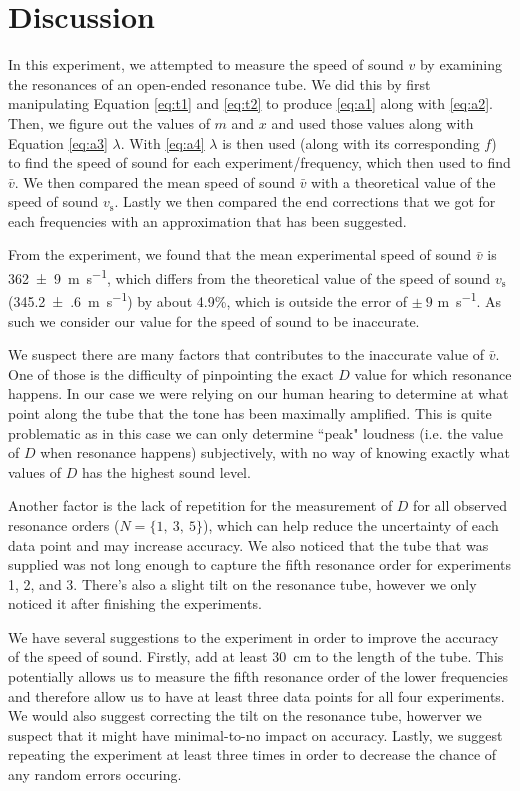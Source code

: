 \documentclass[letter]{article}
\numberwithin{equation}{section}
\numberwithin{figure}{section}
\numberwithin{table}{section}
\begin{document}
\section{Discussion}
In this experiment, we attempted to measure the speed of sound \(v\) by examining the resonances of an open-ended resonance tube. We did this by first manipulating Equation \ref{eq:t1} and \ref{eq:t2} to produce \eqref{eq:a1} along with \eqref{eq:a2}. Then, we figure out the values of \(m\) and \(x\) and used those values along with Equation \ref{eq:a3} \(\lambda\). With \eqref{eq:a4} \(\lambda\) is then used (along with its corresponding \(f\)) to find the speed of sound for each experiment/frequency, which then used to find \(\bar{v}\). We then compared the mean speed of sound \(\bar{v}\) with a theoretical value of the speed of sound \(v_\mathrm{s}\). Lastly we then compared the end corrections that we got for each frequencies with an approximation that has been suggested.

From the experiment, we found that the mean experimental speed of sound \(\bar{v}\) is \SI{362(9)}{\metre\per\second}, which differs from the theoretical value of the speed of sound \(v_{\mathrm{s}}\) (\SI{345.2(6)}{\metre\per\second}) by about 4.9\%, which is outside the error of \(\pm\ 9\) \si{\metre\per\second}. As such we consider our value for the speed of sound to be inaccurate.

We suspect there are many factors that contributes to the inaccurate value of \(\bar{v}\). One of those is the difficulty of pinpointing the exact \(D\) value for which resonance happens. In our case we were relying on our human hearing to determine at what point along the tube that the tone has been maximally amplified. This is quite problematic as in this case we can only determine ``peak" loudness (i.e. the value of \(D\) when resonance happens) subjectively, with no way of knowing exactly what values of \(D\) has the highest sound level.

Another factor is the lack of repetition for the measurement of \(D\) for all observed resonance orders (\(N = \{1, \ 3, \ 5\}\)), which can help reduce the uncertainty of each data point and may increase accuracy. We also noticed that the tube that was supplied was not long enough to capture the fifth resonance order for experiments 1, 2, and 3. There's also a slight tilt on the resonance tube, however we only noticed it after finishing the experiments.

We have several suggestions to the experiment in order to improve the accuracy of the speed of sound. Firstly, add at least \SI{30}{\cm} to the length of the tube. This potentially allows us to measure the fifth resonance order of the lower frequencies and therefore allow us to have at least three data points for all four experiments. We would also suggest correcting the tilt on the resonance tube, howerver we suspect that it might have minimal-to-no impact on accuracy. Lastly, we suggest repeating the experiment at least three times in order to decrease the chance of any random errors occuring.
\end{document}
